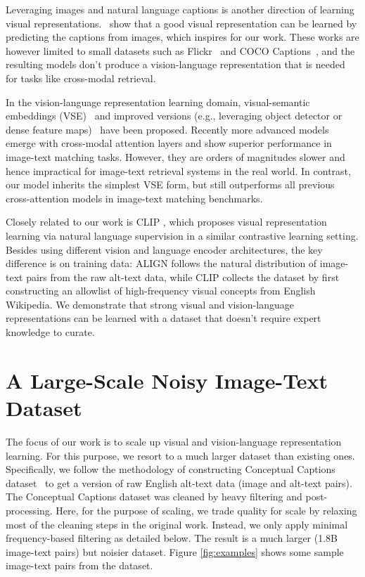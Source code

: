 \documentclass{article}
\begin{document}
Leveraging images and natural language captions is another direction of learning visual representations.~\citet{joulin:flickr,li:ngram,desai:virtex,sariyildiz2020learning,zhang2020contrastive} show that a good visual representation can be learned by predicting the captions from images, which inspires for our work. These works are however limited to small datasets such as Flickr~\cite{joulin:flickr,li:ngram} and COCO Captions~\cite{desai:virtex,sariyildiz2020learning}, and the resulting models don't produce a vision-language representation that is needed for tasks like cross-modal retrieval.

In the vision-language representation learning domain, visual-semantic embeddings (VSE)~\citep{frome:devise,faghri:vse++} and improved versions (e.g., leveraging object detector or dense feature maps)~\citep{socher-etal-2014-grounded,karpathy:2014,kiros:2014,li:vsrn,chen:vsepooling} have been proposed. Recently more advanced models emerge with cross-modal attention layers \cite{lu:vilbert, chen:uniter} and show superior performance in image-text matching tasks. However, they are orders of magnitudes slower and hence impractical for image-text retrieval systems in the real world. In contrast, our model inherits the simplest VSE form, but still outperforms all previous cross-attention models in image-text matching benchmarks.

Closely related to our work is CLIP \cite{radford:clip}, which proposes visual representation learning via natural language supervision in a similar contrastive learning setting. Besides using different vision and language encoder architectures, the key difference is on training data: ALIGN follows the natural distribution of image-text pairs from the raw alt-text data, while CLIP collects the dataset by first constructing an allowlist of high-frequency visual concepts from English Wikipedia. We demonstrate that strong visual and vision-language representations can be learned with a dataset that doesn't require expert knowledge to curate.

\vspace{-2mm}
\section{A Large-Scale Noisy Image-Text Dataset} \label{data}

The focus of our work is to scale up visual and vision-language representation learning. For this purpose, we resort to a much larger dataset than existing ones. Specifically, we follow the methodology of constructing Conceptual Captions dataset~\cite{sharma:cc3m} to get a version of raw English alt-text data (image and alt-text pairs). The Conceptual Captions dataset was cleaned by heavy filtering and post-processing. Here, for the purpose of scaling, we trade quality for scale by relaxing most of the cleaning steps in the original work. Instead, we only apply minimal frequency-based filtering as detailed below. The result is a much larger (1.8B image-text pairs) but noisier dataset. Figure \ref{fig:examples} shows some sample image-text pairs from the dataset.
\end{document}
